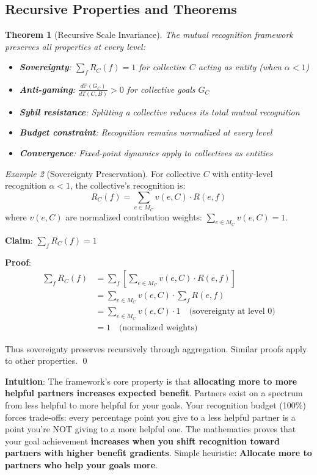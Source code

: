 \documentclass[11pt,a4paper]{article}
\newtheorem{theorem}{Theorem}[section]
\theoremstyle{definition}
\theoremstyle{remark}
\newtheorem{example}[theorem]{Example}
\begin{document}
\subsection{Recursive Properties and Theorems}

\begin{theorem}[Recursive Scale Invariance]
The mutual recognition framework preserves all properties at every level:
\begin{itemize}
\item \textbf{Sovereignty}: $\sum_f R_C(f) = 1$ for collective $C$ acting as entity (when $\alpha < 1$)
\item \textbf{Anti-gaming}: $\frac{d\mathbb{P}(G_C)}{dT(C,B)} > 0$ for collective goals $G_C$
\item \textbf{Sybil resistance}: Splitting a collective reduces its total mutual recognition
\item \textbf{Budget constraint}: Recognition remains normalized at every level
\item \textbf{Convergence}: Fixed-point dynamics apply to collectives as entities
\end{itemize}
\end{theorem}

\begin{example}[Sovereignty Preservation]
For collective $C$ with entity-level recognition $\alpha < 1$, the collective's recognition is:
\[ R_C(f) = \sum_{e \in M_C} v(e,C) \cdot R(e,f) \]
where $v(e,C)$ are normalized contribution weights: $\sum_{e \in M_C} v(e,C) = 1$.

\textbf{Claim}: $\sum_f R_C(f) = 1$

\textbf{Proof}:
\begin{align*}
\sum_f R_C(f) &= \sum_f \left[ \sum_{e \in M_C} v(e,C) \cdot R(e,f) \right] \\
&= \sum_{e \in M_C} v(e,C) \cdot \sum_f R(e,f) \\
&= \sum_{e \in M_C} v(e,C) \cdot 1 \quad \text{(sovereignty at level 0)} \\
&= 1 \quad \text{(normalized weights)}
\end{align*}

Thus sovereignty preserves recursively through aggregation. Similar proofs apply to other properties. \qed
\end{example}


\textbf{Intuition}: The framework's core property is that \textbf{allocating more to more helpful partners increases expected benefit}. Partners exist on a spectrum from less helpful to more helpful for your goals. Your recognition budget (100\%) forces trade-offs: every percentage point you give to a less helpful partner is a point you're NOT giving to a more helpful one. The mathematics proves that your goal achievement \textbf{increases when you shift recognition toward partners with higher benefit gradients}. Simple heuristic: \textbf{Allocate more to partners who help your goals more}.
\end{document}

